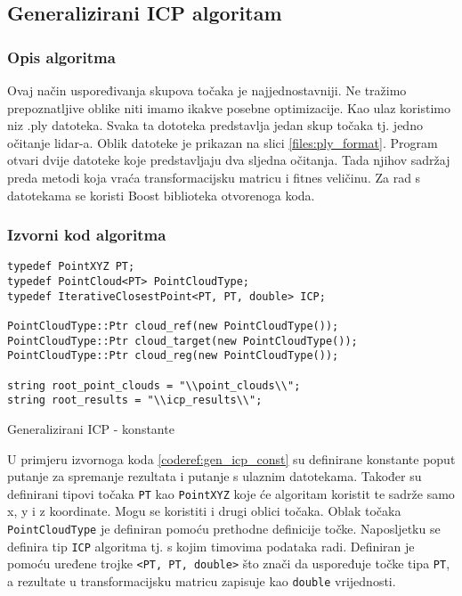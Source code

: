 \subsection{Generalizirani ICP algoritam}

\subsubsection{Opis algoritma}
Ovaj način uspoređivanja skupova točaka je najjednostavniji. Ne tražimo prepoznatljive oblike niti imamo ikakve posebne optimizacije. Kao ulaz koristimo niz .ply datoteka. Svaka ta dototeka predstavlja jedan skup točaka tj. jedno očitanje lidar-a. Oblik datoteke je prikazan na slici \ref{files:ply_format}. Program otvari dvije datoteke koje predstavljaju dva sljedna očitanja. Tada njihov sadržaj preda metodi koja vraća transformacijsku matricu i fitnes veličinu. Za rad s datotekama se koristi Boost biblioteka otvorenoga koda.


\subsubsection{Izvorni kod algoritma}

\begin{listing}[h!]
  \begin{verbatim}
typedef PointXYZ PT;
typedef PointCloud<PT> PointCloudType;
typedef IterativeClosestPoint<PT, PT, double> ICP;

PointCloudType::Ptr cloud_ref(new PointCloudType());
PointCloudType::Ptr cloud_target(new PointCloudType());
PointCloudType::Ptr cloud_reg(new PointCloudType());

string root_point_clouds = "\\point_clouds\\";
string root_results = "\\icp_results\\";
  \end{verbatim}
  \caption{Generalizirani ICP - konstante}
  \label{coderef:gen_icp_const}
\end{listing}

U primjeru izvornoga koda \ref{coderef:gen_icp_const} su definirane konstante poput putanje za spremanje rezultata i putanje s ulaznim datotekama. Također su definirani tipovi točaka \texttt{PT} kao \texttt{PointXYZ} koje će algoritam koristit te sadrže samo x, y i z koordinate. Mogu se koristiti i drugi oblici točaka. Oblak točaka \texttt{PointCloudType} je definiran pomoću prethodne definicije točke. Naposljetku se definira tip \texttt{ICP} algoritma tj. s kojim timovima podataka radi. Definiran je pomoću uređene trojke \texttt{<PT, PT, double>} što znači da uspoređuje točke tipa \texttt{PT}, a rezultate u transformacijsku matricu zapisuje kao \texttt{double} vrijednosti.

